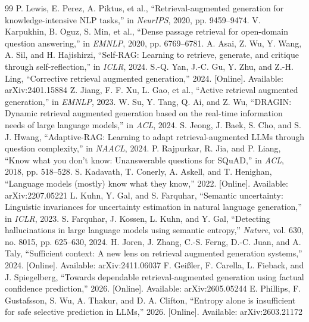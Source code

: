 \documentclass[conference]{IEEEtran}
\begin{document}
\begin{thebibliography}{99}
 P. Lewis, E. Perez, A. Piktus, et al., ``Retrieval-augmented generation for knowledge-intensive NLP tasks,'' in \emph{NeurIPS}, 2020, pp. 9459--9474.
 V. Karpukhin, B. Oguz, S. Min, et al., ``Dense passage retrieval for open-domain question answering,'' in \emph{EMNLP}, 2020, pp. 6769--6781.
 A. Asai, Z. Wu, Y. Wang, A. Sil, and H. Hajishirzi, ``Self-RAG: Learning to retrieve, generate, and critique through self-reflection,'' in \emph{ICLR}, 2024.
 S.-Q. Yan, J.-C. Gu, Y. Zhu, and Z.-H. Ling, ``Corrective retrieval augmented generation,'' 2024. [Online]. Available: arXiv:2401.15884
 Z. Jiang, F. F. Xu, L. Gao, et al., ``Active retrieval augmented generation,'' in \emph{EMNLP}, 2023.
 W. Su, Y. Tang, Q. Ai, and Z. Wu, ``DRAGIN: Dynamic retrieval augmented generation based on the real-time information needs of large language models,'' in \emph{ACL}, 2024.
 S. Jeong, J. Baek, S. Cho, and S. J. Hwang, ``Adaptive-RAG: Learning to adapt retrieval-augmented LLMs through question complexity,'' in \emph{NAACL}, 2024.
 P. Rajpurkar, R. Jia, and P. Liang, ``Know what you don't know: Unanswerable questions for SQuAD,'' in \emph{ACL}, 2018, pp. 518--528.
 S. Kadavath, T. Conerly, A. Askell, and T. Henighan, ``Language models (mostly) know what they know,'' 2022. [Online]. Available: arXiv:2207.05221
 L. Kuhn, Y. Gal, and S. Farquhar, ``Semantic uncertainty: Linguistic invariances for uncertainty estimation in natural language generation,'' in \emph{ICLR}, 2023.
 S. Farquhar, J. Kossen, L. Kuhn, and Y. Gal, ``Detecting hallucinations in large language models using semantic entropy,'' \emph{Nature}, vol. 630, no. 8015, pp. 625--630, 2024.
 H. Joren, J. Zhang, C.-S. Ferng, D.-C. Juan, and A. Taly, ``Sufficient context: A new lens on retrieval augmented generation systems,'' 2024. [Online]. Available: arXiv:2411.06037
 F. Gei{\ss}ler, F. Carella, L. Fieback, and J. Spiegelberg, ``Towards dependable retrieval-augmented generation using factual confidence prediction,'' 2026. [Online]. Available: arXiv:2605.05244
 E. Phillips, F. Gustafsson, S. Wu, A. Thakur, and D. A. Clifton, ``Entropy alone is insufficient for safe selective prediction in LLMs,'' 2026. [Online]. Available: arXiv:2603.21172

\end{thebibliography}
\end{document}
